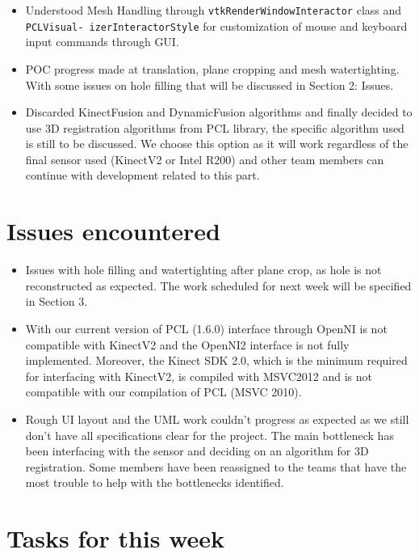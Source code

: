 \documentclass[11pt]{article} %
\begin{document}
\begin{itemize}
	\item Understood Mesh Handling through \texttt{vtkRenderWindowInteractor} class and \texttt{PCLVisual- izerInteractorStyle} for customization of mouse and keyboard input commands through GUI.
	
	\item POC progress made at translation, plane cropping and mesh watertighting. With some issues on hole filling that will be discussed in Section 2: Issues.
	
	\item Discarded KinectFusion and DynamicFusion algorithms and finally decided to use 3D registration algorithms from PCL library, the specific algorithm used is still to be discussed. We choose this option as it will work regardless of the final sensor used (KinectV2 or Intel R200) and other team members can continue with development related to this part.

\end{itemize}

\section{Issues encountered}
\begin{itemize}
	\item Issues with hole filling and watertighting after plane crop, as hole is not reconstructed as expected. The work scheduled for next week will be specified in Section 3.
	
	\item With our current version of PCL (1.6.0) interface through OpenNI is not compatible with KinectV2 and the OpenNI2 interface is not fully implemented. Moreover, the Kinect SDK 2.0, which is the minimum required for interfacing with KinectV2, is compiled with MSVC2012 and is not compatible with our compilation of PCL (MSVC 2010).

	\item Rough UI layout and the UML work couldn't progress as expected as we still don't have all specifications clear for the project. The main bottleneck has been interfacing with the sensor and deciding on an algorithm for 3D registration. Some members have been reassigned to the teams that have the most trouble to help with the bottlenecks identified. 
\end{itemize}

\section{Tasks for this week}
\end{document}
